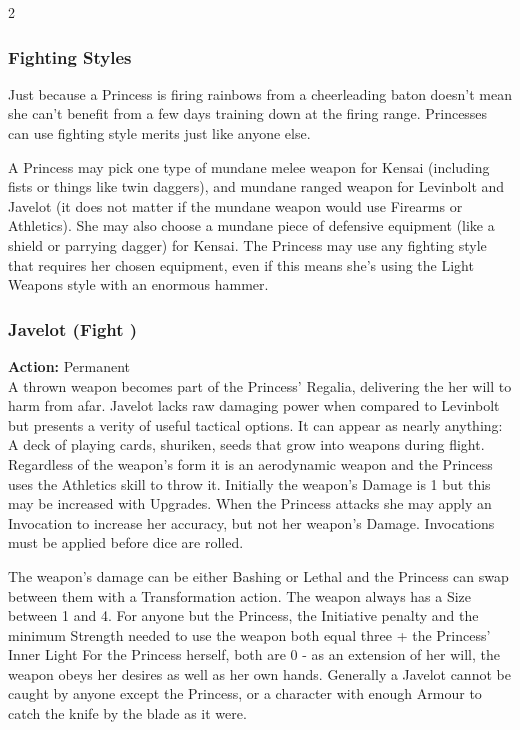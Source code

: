 \begin{multicols}{2}
\begin{mybox}
 
 \subsubsection{Fighting Styles} 
 
 Just because a Princess is firing rainbows from a cheerleading baton doesn’t mean she can't benefit from a few days training down at the firing range. Princesses can use fighting style merits just like anyone else. 
 
  
  
 A Princess may pick one type of mundane melee weapon for Kensai (including fists or things like twin daggers), and mundane ranged weapon for Levinbolt and Javelot (it does not matter if the mundane weapon would use Firearms or Athletics). She may also choose a mundane piece of defensive equipment (like a shield or parrying dagger) for Kensai. The Princess may use any fighting style that requires her chosen equipment, even if this means she's using the Light Weapons style with an enormous hammer. 
\end{mybox}

\subsubsection*{Javelot (Fight \textbullet)}

\noindent \textbf{Action:} Permanent\\

\noindent A thrown weapon becomes part of the Princess’ Regalia, delivering the her will to harm from afar. Javelot lacks raw damaging power when compared to Levinbolt but presents a verity of useful tactical options. It can appear as nearly anything: A deck of playing cards, shuriken, seeds that grow into weapons during flight. Regardless of the weapon's form it is an aerodynamic weapon and the Princess uses the Athletics skill to throw it. Initially the weapon's Damage is 1 but this may be increased with Upgrades. When the Princess attacks she may apply an Invocation to increase her accuracy, but not her weapon's Damage. Invocations must be applied before dice are rolled.

The weapon's damage can be either Bashing or Lethal and the Princess can swap between them with a Transformation action. The weapon always has a Size between 1 and 4. For anyone but the Princess, the Initiative penalty and the minimum Strength needed to use the weapon both equal three + the Princess' Inner Light For the Princess herself, both are 0 - as an extension of her will, the weapon obeys her desires as well as her own hands. Generally a Javelot cannot be caught by anyone except the Princess, or a character with enough Armour to catch the knife by the blade as it were.  


\end{multicols}
